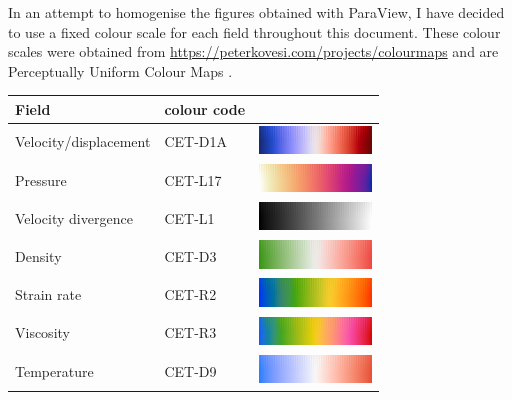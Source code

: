 In an attempt to homogenise the figures obtained with ParaView, I have decided to use 
a fixed colour scale for each field throughout this document. These colour scales were 
obtained from \url{https://peterkovesi.com/projects/colourmaps} and are 
Perceptually Uniform Colour Maps \cite{kove15}. 

\begin{center}
\begin{tabular}{lll}
\hline
Field & colour code & \\
\hline\hline
Velocity/displacement & CET-D1A & \includegraphics[width=3cm]{images/colourscales/CET-D1A}\\
\hline
Pressure& CET-L17 & \includegraphics[width=3cm]{images/colourscales/CET-L17}\\
\hline
Velocity divergence& CET-L1 & \includegraphics[width=3cm]{images/colourscales/CET-L1}\\
\hline
Density& CET-D3 & \includegraphics[width=3cm]{images/colourscales/CET-D3}\\
\hline
Strain rate& CET-R2 & \includegraphics[width=3cm]{images/colourscales/CET-R2}\\
\hline
Viscosity & CET-R3 & \includegraphics[width=3cm]{images/colourscales/CET-R3}\\
\hline
Temperature & CET-D9 & \includegraphics[width=3cm]{images/colourscales/CET-D9}\\
\hline
\end{tabular}
\end{center}






